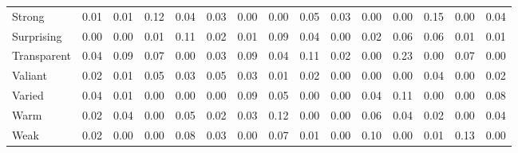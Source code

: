 \documentclass[
]{article}
\newenvironment{lltable}{\begin{landscape}\begin{center}\begin{ThreePartTable}}{\end{ThreePartTable}\end{center}\end{landscape}}
\begin{document}
\begin{lltable}
{\begin{longtable}{lllllllllllllll}
Strong & 0.01 & 0.01 & 0.12 & 0.04 & 0.03 & 0.00 & 0.00 & 0.05 & 0.03 & 0.00 & 0.00 & 0.15 & 0.00 & 0.04\\
Surprising & 0.00 & 0.00 & 0.01 & 0.11 & 0.02 & 0.01 & 0.09 & 0.04 & 0.00 & 0.02 & 0.06 & 0.06 & 0.01 & 0.01\\
Transparent & 0.04 & 0.09 & 0.07 & 0.00 & 0.03 & 0.09 & 0.04 & 0.11 & 0.02 & 0.00 & 0.23 & 0.00 & 0.07 & 0.00\\
Valiant & 0.02 & 0.01 & 0.05 & 0.03 & 0.05 & 0.03 & 0.01 & 0.02 & 0.00 & 0.00 & 0.00 & 0.04 & 0.00 & 0.02\\
Varied & 0.04 & 0.01 & 0.00 & 0.00 & 0.00 & 0.09 & 0.05 & 0.00 & 0.00 & 0.04 & 0.11 & 0.00 & 0.00 & 0.08\\
Warm & 0.02 & 0.04 & 0.00 & 0.05 & 0.02 & 0.03 & 0.12 & 0.00 & 0.00 & 0.06 & 0.04 & 0.02 & 0.00 & 0.04\\
Weak & 0.02 & 0.00 & 0.00 & 0.08 & 0.03 & 0.00 & 0.07 & 0.01 & 0.00 & 0.10 & 0.00 & 0.01 & 0.13 & 0.00\\
\bottomrule
\end{longtable}

}

\end{lltable}
\end{document}
